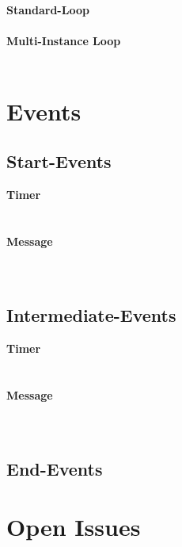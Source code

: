 \textbf{Standard-Loop}\\\\

\textbf{Multi-Instance Loop}\\\\


\section{Events}

\subsection{Start-Events}

\textbf{Timer}\\
\\\\

\textbf{Message}\\
\\\\

\subsection{Intermediate-Events}
\textbf{Timer}\\
\\\\

\textbf{Message}\\
\\\\

\subsection{End-Events}


\section{Open Issues}